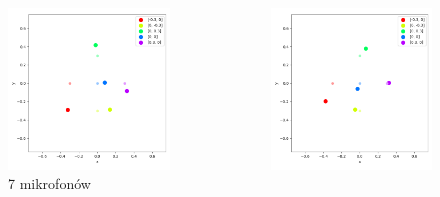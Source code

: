 \begin{frame}{}
    \begin{columns}
        \begin{column}{0.5\textwidth}
            \begin{figure}
                \centering
                \includegraphics[width=\textwidth]{../pics/mult_lat_2d_num/positions_7_mean.png}
                \caption{7 mikrofonów}
            \end{figure}
        \end{column}
        \begin{column}{0.5\textwidth}
            \begin{figure}
                \centering
                \includegraphics[width=\textwidth]{../pics/mult_lat_2d_num/positions_8_mean.png}

\end{figure}
\end{column}
\end{columns}
\end{frame}
